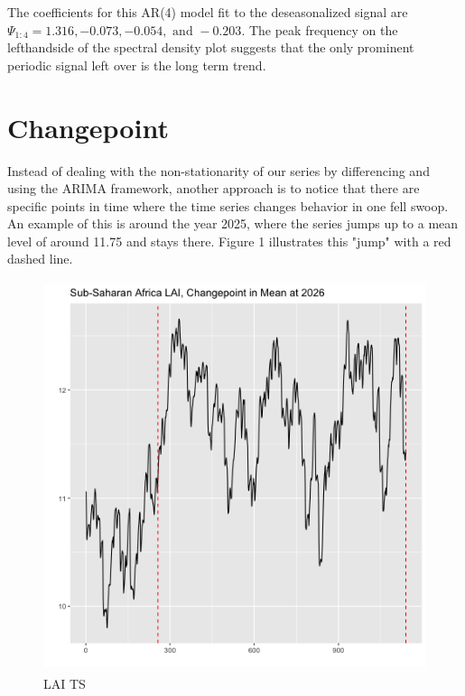 \documentclass[11pt]{article}
\begin{document}
The coefficients for this AR(4) model fit to the deseasonalized signal are
$\Psi_{1:4} = 1.316, -0.073, -0.054, \textrm{ and } -0.203$. The peak
frequency on the lefthandside of the spectral density plot suggests that the
only prominent periodic signal left over is the long term trend.

\section{Changepoint}

Instead of dealing with the non-stationarity of our series by differencing and using the ARIMA framework, another approach is to notice that there are specific points in time where the time series changes behavior in one fell swoop. An example of this is around the year 2025, where the series jumps up to a mean level of around 11.75 and stays there. Figure 1 illustrates this "jump" with a red dashed line.
\begin{figure}[h]
	\centering
	\includegraphics[width=5in, height=4.5in]{../img/changepoint_LAI.png}
	\caption{LAI TS}
\end{figure}
\end{document}
